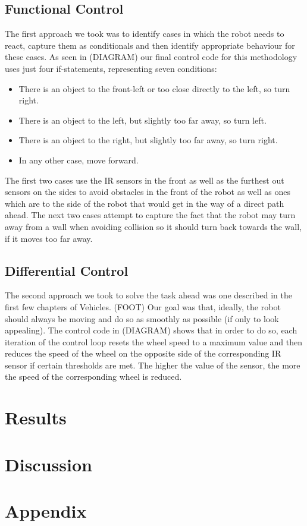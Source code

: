 \documentclass[paper=a4, fontsize=12pt]{scrartcl}	%
\numberwithin{equation}{section}		%
\numberwithin{figure}{section}			%
\numberwithin{table}{section}				%
\begin{document}
\subsection{Functional Control}
The first approach we took was to identify cases in which the robot needs to react, capture them as conditionals and then identify appropriate behaviour for these cases. As seen in (DIAGRAM) our final control code for this methodology uses just four if-statements, representing seven conditions:
\begin{itemize}
 \item There is an object to the front-left or too close directly to the left, so turn right.
 \item There is an object to the left, but slightly too far away, so turn left.
 \item There is an object to the right, but slightly too far away, so turn right.
 \item In any other case, move forward.
\end{itemize}
The first two cases use the IR sensors in the front as well as the furthest out sensors on the sides to avoid obstacles in the front of the robot as well as ones which are to the side of the robot that would get in the way of a direct path ahead. The next two cases attempt to capture the fact that the robot may turn away from a wall when avoiding collision so it should turn back towards the wall, if it moves too far away.
\subsection{Differential Control}
The second approach we took to solve the task ahead was one described in the first few chapters of Vehicles. (FOOT) Our goal was that, ideally, the robot should always be moving and do so as smoothly as possible (if only to look appealing). The control code in (DIAGRAM) shows that in order to do so, each iteration of the control loop resets the wheel speed to a maximum value and then reduces the speed of the wheel on the opposite side of the corresponding IR sensor if certain thresholds are met. The higher the value of the sensor, the more the speed of the corresponding wheel is reduced.
\section{Results}
\section{Discussion}
\section{Appendix}

\end{document}
